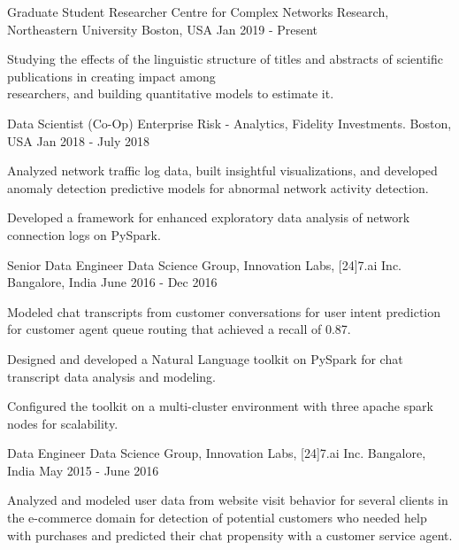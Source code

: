 \begin{cventries}
  \cventry
    {Graduate Student Researcher}
    {Centre for Complex Networks Research, Northeastern University}
    {Boston, USA}
    {Jan 2019 - Present}
    {
      \begin{cvitems}
        \item {Studying the effects of the linguistic structure of titles and abstracts of scientific publications in creating impact among \\ researchers, and building quantitative models to estimate it.}
        \end{cvitems}
    }
  \cventry
    {Data Scientist (Co-Op)}
    {Enterprise Risk - Analytics, Fidelity Investments.}
    {Boston, USA}
    {Jan 2018 - July 2018}
    {
      \begin{cvitems}
        \item {Analyzed network traffic log data, built insightful visualizations, and developed anomaly detection predictive models for abnormal network activity detection.}
        \item {Developed a framework for enhanced exploratory data analysis of network connection logs on PySpark.}
      \end{cvitems}
    }
  \cventry
    {Senior Data Engineer}
    {Data Science Group, Innovation Labs, [24]7.ai Inc.}
    {Bangalore, India}
    {June 2016 - Dec 2016}
    {
      \begin{cvitems}
        \item {Modeled chat transcripts from customer conversations for user intent prediction for customer agent queue routing that achieved a recall of 0.87.}
        \item {Designed and developed a Natural Language toolkit on PySpark for chat transcript data analysis and modeling.}
        \item {Configured the toolkit on a multi-cluster environment with three apache spark nodes for scalability.}
      \end{cvitems}
    }
  \cventry
    {Data Engineer}
    {Data Science Group, Innovation Labs, [24]7.ai Inc.}  
    {Bangalore, India}
    {May 2015 - June 2016}
    {
      \begin{cvitems}
        \item {Analyzed and modeled user data from website visit behavior for several clients in the e-commerce domain for detection of potential customers who needed help with purchases and predicted their chat propensity with a customer service agent.}

\end{cvitems}}
\end{cventries}
